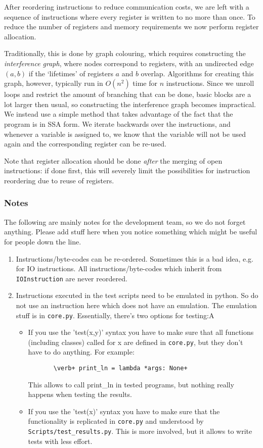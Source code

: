 After reordering instructions to reduce communication costs, we are left with
a sequence of instructions where every register is written to no more than
once. To reduce the number of registers and memory requirements we now
perform register allocation.

Traditionally, this is done by graph colouring, which requires constructing
the \emph{interference
graph}, where nodes correspond to registers, with an undirected edge $(a,b)$ if
the `lifetimes' of registers $a$ and $b$ overlap. Algorithms for creating this
graph, however, typically run in $O(n^2)$ time for $n$ instructions. Since we
unroll loops and restrict the amount of branching that can be done, basic blocks
are a lot larger then usual, so constructing the interference graph becomes
impractical. We instead use a simple method that takes advantage of the fact
that the program is in SSA form. We iterate backwards over the instructions,
and whenever a variable is assigned to, we know that the variable will not be
used again and the corresponding register can be re-used.

Note that register allocation should be done \emph{after} the merging of open
instructions: if done first, this will severely limit the possibilities for
instruction reordering due to reuse of registers.


\subsubsection{Notes}
The following are mainly notes for the development team, so we
do not forget anything. Please add stuff here when you notice 
something which might be useful for people down the line.

\begin{enumerate}
\item Instructions/byte-codes can be re-ordered. Sometimes this is a bad idea,
e.g. for IO instructions. All instructions/byte-codes which inherit from
\verb+IOInstruction+ are never reordered.
\item Instructions executed in the test scripts need to be emulated in
python. So do not use an instruction here which does not have an emulation.
The emulation stuff is in \verb+core.py+.
Essentially, there's two options for testing:A
\begin{itemize}
\item If you use the 'test(x,y)' syntax you have to make sure that all functions (including classes) called for x are defined in \verb+core.py+, but they don't have to do anything. For example: 
\begin{verbatim}
       \verb+ print_ln = lambda *args: None+
\end{verbatim}
This allows to call print_ln in tested programs, but nothing really happens when testing the results.
\item If you use the 'test(x)' syntax you have to make sure that the functionality is replicated in \verb+core.py+ and understood by \verb+Scripts/test_results.py+. This is more involved, but it allows to write tests with less effort. 
\end{itemize}
\end{enumerate}


